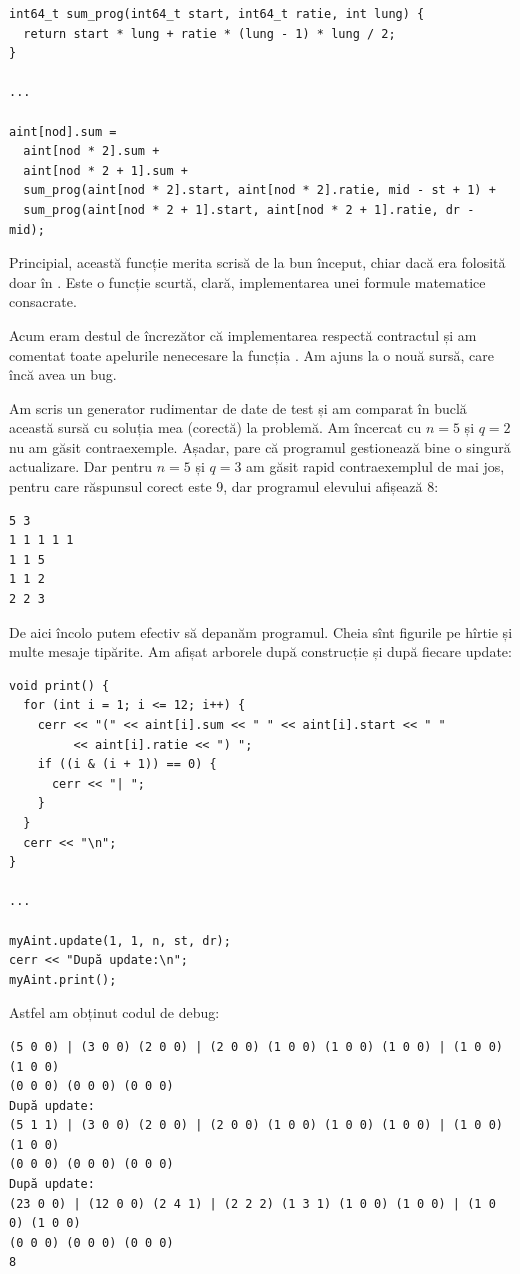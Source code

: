 \documentclass[../main.tex]{subfiles}
\begin{document}
\begin{verbatim}
int64_t sum_prog(int64_t start, int64_t ratie, int lung) {
  return start * lung + ratie * (lung - 1) * lung / 2;
}

...

aint[nod].sum =
  aint[nod * 2].sum +
  aint[nod * 2 + 1].sum +
  sum_prog(aint[nod * 2].start, aint[nod * 2].ratie, mid - st + 1) +
  sum_prog(aint[nod * 2 + 1].start, aint[nod * 2 + 1].ratie, dr - mid);
\end{verbatim}

Principial, această funcție merita scrisă de la bun început, chiar dacă era folosită doar în . Este o funcție scurtă, clară, implementarea unei formule matematice consacrate.

Acum eram destul de încrezător că implementarea respectă contractul și am comentat toate apelurile nenecesare la funcția . Am ajuns la o nouă sursă, care încă avea un bug.

Am scris un generator rudimentar de date de test și am comparat în buclă această sursă cu soluția mea (corectă) la problemă. Am încercat cu $n=5$ și $q=2$ nu am găsit contraexemple. Așadar, pare că programul gestionează bine o singură actualizare. Dar pentru $n=5$ și $q=3$ am găsit rapid contraexemplul de mai jos, pentru care răspunsul corect este 9, dar programul elevului afișează 8:

\begin{verbatim}
5 3
1 1 1 1 1
1 1 5
1 1 2
2 2 3
\end{verbatim}

De aici încolo putem efectiv să depanăm programul. Cheia sînt figurile pe hîrtie și multe mesaje tipărite. Am afișat arborele după construcție și după fiecare update:

\begin{verbatim}
void print() {
  for (int i = 1; i <= 12; i++) {
    cerr << "(" << aint[i].sum << " " << aint[i].start << " "
         << aint[i].ratie << ") ";
    if ((i & (i + 1)) == 0) {
      cerr << "| ";
    }
  }
  cerr << "\n";
}

...

myAint.update(1, 1, n, st, dr);
cerr << "După update:\n";
myAint.print();
\end{verbatim}

Astfel am obținut codul de debug:

\begin{verbatim}
(5 0 0) | (3 0 0) (2 0 0) | (2 0 0) (1 0 0) (1 0 0) (1 0 0) | (1 0 0) (1 0 0)
(0 0 0) (0 0 0) (0 0 0)
După update:
(5 1 1) | (3 0 0) (2 0 0) | (2 0 0) (1 0 0) (1 0 0) (1 0 0) | (1 0 0) (1 0 0)
(0 0 0) (0 0 0) (0 0 0)
După update:
(23 0 0) | (12 0 0) (2 4 1) | (2 2 2) (1 3 1) (1 0 0) (1 0 0) | (1 0 0) (1 0 0)
(0 0 0) (0 0 0) (0 0 0)
8
\end{verbatim}
\end{document}
